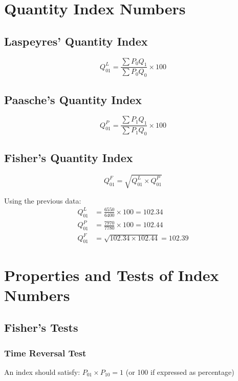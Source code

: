 \documentclass[twoside]{book}
\begin{document}
\section{Quantity Index Numbers}

\subsection{Laspeyres' Quantity Index}
\begin{equation}
    Q_{01}^L = \frac{\sum P_0 Q_1}{\sum P_0 Q_0} \times 100
\end{equation}

\subsection{Paasche's Quantity Index}
\begin{equation}
    Q_{01}^P = \frac{\sum P_1 Q_1}{\sum P_1 Q_0} \times 100
\end{equation}

\subsection{Fisher's Quantity Index}
\begin{equation}
    Q_{01}^F = \sqrt{Q_{01}^L \times Q_{01}^P}
\end{equation}

Using the previous data:
\begin{align}
    Q_{01}^L &= \frac{6550}{6400} \times 100 = 102.34 \\
    Q_{01}^P &= \frac{7970}{7780} \times 100 = 102.44 \\
    Q_{01}^F &= \sqrt{102.34 \times 102.44} = 102.39
\end{align}

\section{Properties and Tests of Index Numbers}

\subsection{Fisher's Tests}

\subsubsection{Time Reversal Test}
An index should satisfy: $P_{01} \times P_{10} = 1$ (or 100 if expressed as percentage)
\end{document}
